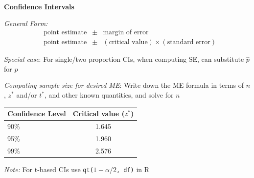 \textbf{Confidence Intervals}

\textit{General Form:}
\begin{align*}
    &\text{point estimate} &\pm& \text{margin of error} \\
    &\text{point estimate} &\pm& (\text{critical value}) \times (\text{standard error})
\end{align*}

\textit{Special case}: For single/two proportion CIs,  when computing SE, can substitute $\hat{p}$ for $p$

\textit{Computing sample size for desired ME}: Write down the ME formula in terms of $n$, $z^*$ and/or $t^*$, and other known quantities, and solve for $n$

\begin{center}

\begin{tabular}{|l|c|}
\hline
\textbf{Confidence Level} & \textbf{Critical value }($z^*$) \\
\hline
90\% & 1.645 \\
95\% & 1.960 \\
99\% & 2.576 \\
\hline
\end{tabular}%

\smallskip

\small\textit{Note:} For t-based CIs use \texttt{qt($1-\alpha/2$, df)} in R
\end{center}